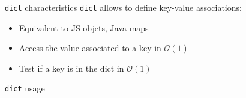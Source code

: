 \begin{frame}{\texttt{dict} characteristics}
  \texttt{dict} allows to define key-value associations:
  \begin{itemize}
    \item Equivalent to JS objets, Java maps
    \item Access the value associated to a key in $\mathcal{O}(1)$
    \item Test if a key is in the dict in $\mathcal{O}(1)$
  \end{itemize}
\end{frame}

\begin{frame}{\texttt{dict} usage}
\end{frame}
